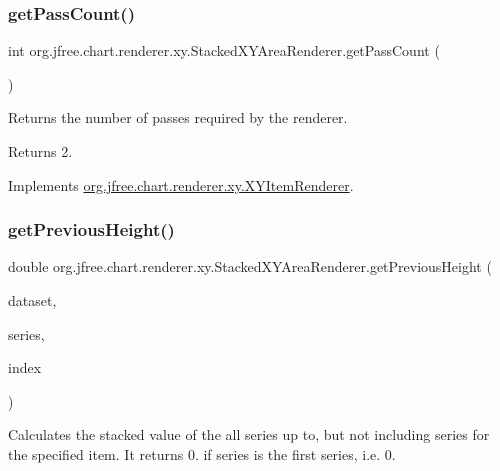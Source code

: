 \subsubsection{\texorpdfstring{get\+Pass\+Count()}{getPassCount()}}
{\footnotesize\ttfamily int org.\+jfree.\+chart.\+renderer.\+xy.\+Stacked\+X\+Y\+Area\+Renderer.\+get\+Pass\+Count (\begin{DoxyParamCaption}{ }\end{DoxyParamCaption})}

Returns the number of passes required by the renderer.

\begin{DoxyReturn}{Returns}
2. 
\end{DoxyReturn}


Implements \mbox{\hyperlink{interfaceorg_1_1jfree_1_1chart_1_1renderer_1_1xy_1_1_x_y_item_renderer_afe42489776da2a4c7e64838382bbaea1}{org.\+jfree.\+chart.\+renderer.\+xy.\+X\+Y\+Item\+Renderer}}.

\mbox{\label{classorg_1_1jfree_1_1chart_1_1renderer_1_1xy_1_1_stacked_x_y_area_renderer_ae718562587452aa3ac1c8e08b2debfb5}} 
\subsubsection{\texorpdfstring{get\+Previous\+Height()}{getPreviousHeight()}}
{\footnotesize\ttfamily double org.\+jfree.\+chart.\+renderer.\+xy.\+Stacked\+X\+Y\+Area\+Renderer.\+get\+Previous\+Height (\begin{DoxyParamCaption}\item[{\mbox{\hyperlink{interfaceorg_1_1jfree_1_1data_1_1xy_1_1_table_x_y_dataset}{Table\+X\+Y\+Dataset}}}]{dataset,  }\item[{int}]{series,  }\item[{int}]{index }\end{DoxyParamCaption})\hspace{0.3cm}{\ttfamily [protected]}}

Calculates the stacked value of the all series up to, but not including {\ttfamily series} for the specified item. It returns 0. if {\ttfamily series} is the first series, i.\+e. 0.


